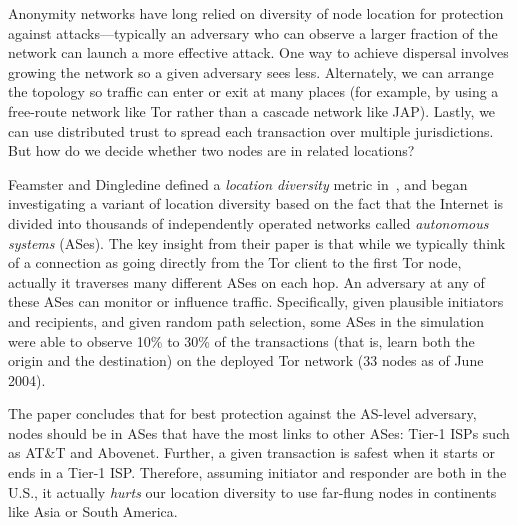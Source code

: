 \documentclass{llncs}
\begin{document}
Anonymity networks have long relied on diversity of node location for
protection against attacks---typically an adversary who can observe a
larger fraction of the network can launch a more effective attack. One
way to achieve dispersal involves growing the network so a given adversary
sees less. Alternately, we can arrange the topology so traffic can enter
or exit at many places (for example, by using a free-route network
like Tor rather than a cascade network like JAP). Lastly, we can use
distributed trust to spread each transaction over multiple jurisdictions.
But how do we decide whether two nodes are in related locations?

Feamster and Dingledine defined a \emph{location diversity} metric
in~\cite{feamster:wpes2004}, and began investigating a variant of location
diversity based on the fact that the Internet is divided into thousands of
independently operated networks called {\em autonomous systems} (ASes).
The key insight from their paper is that while we typically think of a
connection as going directly from the Tor client to the first Tor node,
actually it traverses many different ASes on each hop. An adversary at
any of these ASes can monitor or influence traffic. Specifically, given
plausible initiators and recipients, and given random path selection,
some ASes in the simulation were able to observe 10\% to 30\% of the
transactions (that is, learn both the origin and the destination) on
the deployed Tor network (33 nodes as of June 2004).

The paper concludes that for best protection against the AS-level
adversary, nodes should be in ASes that have the most links to other ASes:
Tier-1 ISPs such as AT\&T and Abovenet. Further, a given transaction
is safest when it starts or ends in a Tier-1 ISP\@. Therefore, assuming
initiator and responder are both in the U.S., it actually \emph{hurts}
our location diversity to use far-flung nodes in
continents like Asia or South America.
%
\end{document}

